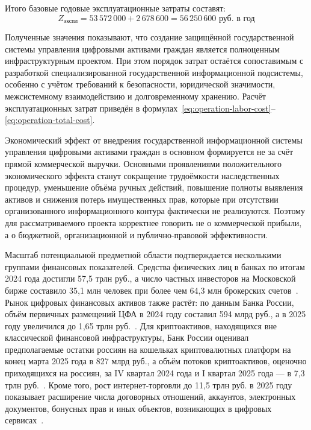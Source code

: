 Итого базовые годовые эксплуатационные затраты составят:
\begin{equation}
Z_{\text{экспл}} = 53\,572\,000 + 2\,678\,600 = 56\,250\,600 \text{ руб. в год}
\label{eq:operation-total-cost}
\end{equation}

Полученные значения показывают, что создание защищённой государственной системы управления цифровыми активами граждан является полноценным инфраструктурным проектом. При этом порядок затрат остаётся сопоставимым с разработкой специализированной государственной информационной подсистемы, особенно с учётом требований к безопасности, юридической значимости, межсистемному взаимодействию и долговременному хранению. Расчёт эксплуатационных затрат приведён в формулах~\eqref{eq:operation-labor-cost}--\eqref{eq:operation-total-cost}.


Экономический эффект от внедрения государственной информационной системы управления цифровыми активами граждан в основном формируется не за счёт прямой коммерческой выручки. Основными проявлениями положительного экономического эффекта станут сокращение трудоёмкости наследственных процедур, уменьшение объёма ручных действий, повышение полноты выявления активов и снижения потерь имущественных прав, которые при отсутствии организованного информационного контура фактически не реализуются. Поэтому для рассматриваемого проекта корректнее говорить не о коммерческой прибыли, а о бюджетной, организационной и публично-правовой эффективности.

Масштаб потенциальной предметной области подтверждается несколькими группами финансовых показателей. Средства физических лиц в банках по итогам 2024 года достигли 57{,}5 трлн руб., а число частных инвесторов на Московской бирже составило 35{,}1 млн человек при более чем 64{,}3 млн брокерских счетов~\cite{bankRussia2024HouseholdFunds, moex2024RetailInvestors}. Рынок цифровых финансовых активов также растёт: по данным Банка России, объём первичных размещений ЦФА в 2024 году составил 594 млрд руб., а в 2025 году увеличился до 1{,}65 трлн руб.~\cite{bankRussia2024CFAReview, bankRussia2025CFAReview}. Для криптоактивов, находящихся вне классической финансовой инфраструктуры, Банк России оценивал предполагаемые остатки россиян на кошельках криптовалютных платформ на конец марта 2025 года в 827 млрд руб., а объём потоков криптоактивов, оценочно приходящихся на россиян, за IV квартал 2024 года и I квартал 2025 года --- в 7{,}3 трлн руб.~\cite{bankRussia2025CryptoFlows}. Кроме того, рост интернет-торговли до 11{,}5 трлн руб. в 2025 году показывает расширение числа договорных отношений, аккаунтов, электронных документов, бонусных прав и иных объектов, возникающих в цифровых сервисах~\cite{akitEcommerceRussia2025}.


